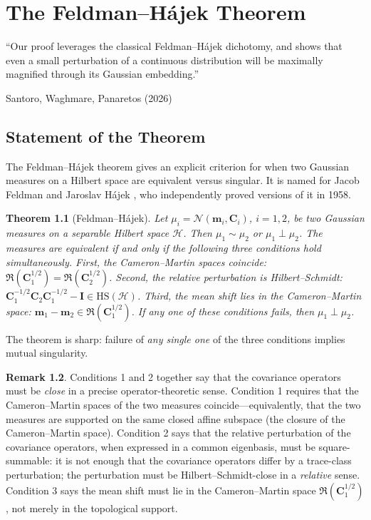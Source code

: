 \documentclass[12pt, oneside]{book}
\theoremstyle{plain}
\newtheorem{theorem}{Theorem}[chapter]
\theoremstyle{definition}
\newtheorem{remark}[theorem]{Remark}
\newcommand{\calH}{\mathcal{H}}
\newcommand{\calN}{\mathcal{N}}
\newcommand{\HS}{\mathrm{HS}}
\newcommand{\ran}{\mathfrak{R}}
\begin{document}
\chapter{The Feldman--H\'ajek Theorem}
\label{chap:fh}

\epigraph{``Our proof leverages the classical Feldman--H\'ajek dichotomy, and shows that
even a small perturbation of a continuous distribution will be maximally magnified
through its Gaussian embedding.''}%
{Santoro, Waghmare, Panaretos (2026)}

\section{Statement of the Theorem}

The Feldman--H\'ajek theorem gives an explicit criterion for when two Gaussian measures on a Hilbert space are equivalent versus singular. It is named for Jacob Feldman \cite{Feldman1958} and Jaroslav H\'ajek \cite{Hajek1958}, who independently proved versions of it in 1958.

\begin{theorem}[Feldman--H\'ajek]
\label{thm:FH}
Let $\mu_i = \calN(\mathbf{m}_i, \mathbf{C}_i)$, $i = 1, 2$, be two Gaussian measures on a separable Hilbert space $\calH$. Then $\mu_1 \sim \mu_2$ or $\mu_1 \perp \mu_2$. The measures are equivalent if and only if the following three conditions hold simultaneously. First, the Cameron--Martin spaces coincide: $\ran(\mathbf{C}_1^{1/2}) = \ran(\mathbf{C}_2^{1/2})$. Second, the relative perturbation is Hilbert--Schmidt: $\mathbf{C}_1^{-1/2} \mathbf{C}_2 \mathbf{C}_1^{-1/2} - \mathbf{I} \in \HS(\calH)$. Third, the mean shift lies in the Cameron--Martin space: $\mathbf{m}_1 - \mathbf{m}_2 \in \ran(\mathbf{C}_1^{1/2})$. If any one of these conditions fails, then $\mu_1 \perp \mu_2$.
\end{theorem}

\noindent The theorem is sharp: failure of \emph{any single one} of the three conditions implies mutual singularity.

\begin{remark}
Conditions 1 and 2 together say that the covariance operators must be \emph{close} in a precise operator-theoretic sense. Condition 1 requires that the Cameron--Martin spaces of the two measures coincide---equivalently, that the two measures are supported on the same closed affine subspace (the closure of the Cameron--Martin space). Condition 2 says that the relative perturbation of the covariance operators, when expressed in a common eigenbasis, must be square-summable: it is not enough that the covariance operators differ by a trace-class perturbation; the perturbation must be Hilbert--Schmidt-close in a \emph{relative} sense. Condition 3 says the mean shift must lie in the Cameron--Martin space $\ran(\mathbf{C}_1^{1/2})$, not merely in the topological support.
\end{remark}
\end{document}
